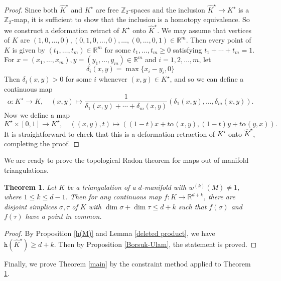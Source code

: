\documentclass[amsfonts]{amsart}
\numberwithin{equation}{section}
\newtheorem{theorem}{Theorem}[section]
\theoremstyle{definition}
\theoremstyle{remark}
\newcommand{\Z}{\mathbb{Z}}
\newcommand{\R}{\mathbb{R}}
\newcommand{\h}{\mathtt{h}}
\begin{document}
  \begin{proof}
    Since both $\widehat{K}^\star$ and $K^\star$ are free $\Z_2$-spaces and the inclusion $\widehat{K}^\star \to K^\star$ is a $\Z_2$-map, it is sufficient to show that the inclusion is a homotopy equivalence. So we construct a deformation retract of $K^\star$ onto $\widehat{K}^\star$. We may assume that vertices of $K$ are $(1,0,\ldots,0),(0,1,0,\ldots,0),\ldots,(0,\ldots,0,1)\in\R^m$. Then every point of $K$ is given by $(t_1,\ldots,t_m)\in\R^m$ for some $t_1,\ldots,t_m\ge 0$ satisfying $t_1+\cdots+t_m=1$. For $x=(x_1,\ldots,x_m),y=(y_1,\ldots,y_m)\in\R^m$ and $i=1,2,\ldots,m$, let
    \[
      \delta_i(x,y)=\max\{x_i-y_i,0\}
    \]
    Then $\delta_i(x,y)>0$ for some $i$ whenever $(x,y)\in K^\star$, and so we can define a continuous map
    \[
      \alpha\colon K^\star\to K,\quad(x,y)\mapsto\frac{1}{\delta_1(x,y)+\cdots+\delta_m(x,y)}(\delta_1(x,y),\ldots,\delta_m(x,y)).
    \]
    Now we define a map
    \[
      K^\star\times[0,1]\to K^\star,\quad((x,y),t)\mapsto((1-t)x+t\alpha(x,y),(1-t)y+t\alpha(y,x)).
    \]
    It is straightforward to check that this is a deformation retraction of $K^\star$ onto $\widehat{K}^\star$, completing the proof.
  \end{proof}



  We are ready to prove the topological Radon theorem for maps out of manifold triangulations.

  \begin{theorem}
    \label{Radon}
    Let $K$ be a triangulation of a $d$-manifold with $w^{(k)}(M)\ne 1$, where $1\le k\le d-1$. Then for any continuous map $f\colon K\to\R^{d+k}$, there are disjoint simplices $\sigma,\tau$ of $K$ with $\dim\sigma+\dim\tau\le d+k$ such that $f(\sigma)$ and $f(\tau)$ have a point in common.
  \end{theorem}

  \begin{proof}
    By Proposition \ref{h(M)} and Lemma \ref{deleted product}, we have $\h(\widehat{K}^\star)\ge d+k$. Then by Proposition \ref{Borsuk-Ulam}, the statement is proved.
  \end{proof}



  Finally, we prove Theorem \ref{main} by the constraint method \cite{BFZ} applied to Theorem \ref{Radon}.
\end{document}
